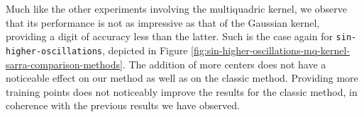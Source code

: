 \documentclass[12pt]{report} %
\begin{document}
Much like the other experiments involving the multiquadric kernel, we observe that its performance is not as impressive as that of the Gaussian kernel, providing a digit of accuracy less than the latter. Such is the case again for \texttt{sin-higher-oscillations}, depicted in Figure \ref{fig:sin-higher-oscillations-mq-kernel-sarra-comparison-methods}. The addition of more centers does not have a noticeable effect on our method as well as on the classic method. %
Providing more training points does not noticeably improve the results for the classic method, in coherence with the previous results we have observed.
\end{document}
